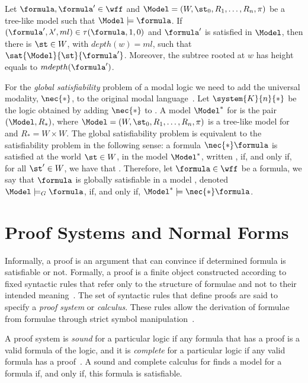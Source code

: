 \begin{example}
    \begin{theorem}
        Let $\formula, \formula' \in \wff$ and $\Model = (W, \st_0, R_1, \ldots,
        R_n, \pi)$ be a tree-like model such that $\Model \models \formula$. If
        $(\formula', \lambda', ml) \in \tau(\formula, 1, 0)$ and
        $\formula'$ is satisfied in $\Model$, then there is $\st \in W$, with
        $depth(w) = ml$, such that $\sat{\Model}{\st}{\formula'}$. Moreover,
        the subtree rooted at $w$ has height equals to $mdepth(\formula')$.
    \end{theorem}
\end{example}

For the \emph{global satisfiability} problem of a modal logic we need to add the
universal modality, $\nec{*}$, to the original modal
language~\cite{goranko1992using}. Let $\system{K}{n}{*}$ be the logic obtained
by adding $\nec{*}$ to . A model $\Model^*$ for 
is the pair $(\Model, R_*)$, where $\Model = (W, \st_0, R_1, \ldots, R_n, \pi)$
is a tree-like model for  and $R_* = W \times W$. The global
satisfiability problem is equivalent to the satisfiability problem in the
following sense: a formula $\nec{*} \formula$ is satisfied at the world $\st \in
W$, in the model $\Model^*$, written \sat{\Model^*}{\st}{\nec{*}\formula}, if,
and only if, for all $\st' \in W$, we have that .
Therefore, let $\formula \in \wff$ be a formula, we say that $\formula$ is
globally satisfiable in a model \Model, denoted $\Model \models_G \formula$, if,
and only if, $\Model^* \models \nec{*} \formula$.

\section{Proof Systems and Normal Forms}

Informally, a proof is an argument that can convince if determined formula is
satisfiable or not. Formally, a proof is a finite object constructed according
to fixed syntactic rules that refer only to the structure of formulae and not to
their intended meaning~\cite{fitting}. The set of syntactic rules that define
proofs are said to specify a \emph{proof system} or \emph{calculus}. These rules
allow the derivation of formulae from formulae through strict symbol
manipulation~\cite{resolutionbased}.

A proof system is \emph{sound} for a particular logic if any formula that has a
proof is a valid formula of the logic, and it is \emph{complete} for a
particular logic if any valid formula has a proof~\cite{fitting}. A sound and
complete calculus for  finds a model for a formula if, and only
if, this formula is satisfiable.

